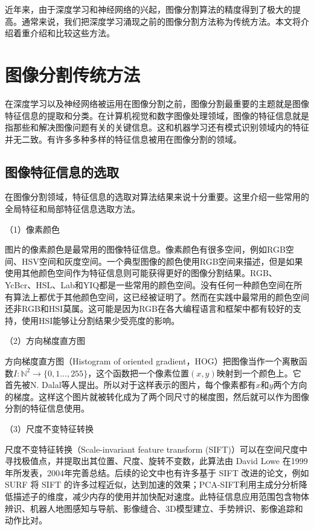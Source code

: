 \documentclass{article}
\begin{document}
近年来，由于深度学习和神经网络的兴起，图像分割算法的精度得到了极大的提高。通常来说，我们把深度学习涌现之前的图像分割方法称为传统方法。本文将介绍着重介绍和比较这些方法。

\section{图像分割传统方法}
在深度学习以及神经网络被运用在图像分割之前，图像分割最重要的主题就是图像特征信息的提取和分类。在计算机视觉和数字图像处理领域，图像的特征信息就是指那些和解决图像问题有关的关键信息。这和机器学习还有模式识别领域内的特征并无二致。有许多多种多样的特征信息被用在图像分割的领域。

\subsection{图像特征信息的选取}
在图像分割领域，特征信息的选取对算法结果来说十分重要。这里介绍一些常用的全局特征和局部特征信息选取方法。

（1）像素颜色

图片的像素颜色是最常用的图像特征信息。像素颜色有很多空间，例如RGB空间、HSV空间和灰度空间。一个典型图像的颜色使用RGB空间来描述，但是如果使用其他颜色空间作为特征信息则可能获得更好的图像分割结果。RGB、 YcBcr、HSL、Lab和YIQ都是一些常用的颜色空间。没有任何一种颜色空间在所有算法上都优于其他颜色空间，这已经被证明了\citep{Color_image_segmentation}。然而在实践中最常用的颜色空间还非RGB和HSI莫属。这可能是因为RGB在各大编程语言和框架中都有较好的支持，使用HSI能够让分割结果少受亮度的影响。

（2）方向梯度直方图

方向梯度直方图（Histogram of oriented gradient，HOG）把图像当作一个离散函数$I: \mathbb{N}^2 \rightarrow \{0,1...,255\}$，这个函数把一个像素位置$(x,y)$映射到一个颜色上。它首先被N. Dalal等人提出\citep{1467360}。所以对于这样表示的图片，每个像素都有$x$和$y$两个方向的梯度。这样这个图片就被转化成为了两个同尺寸的梯度图，然后就可以作为图像分割的特征信息使用。

（3）尺度不变特征转换

尺度不变特征转换（Scale-invariant feature transform (SIFT)）可以在空间尺度中寻找极值点，并提取出其位置、尺度、旋转不变数，此算法由 David Lowe 在1999年所发表，2004年完善总结\citep{Lowe2004}。后续的论文中也有许多基于 SIFT 改进的论文，例如 SURF 将 SIFT 的许多过程近似，达到加速的效果；PCA-SIFT利用主成分分析降低描述子的维度，减少内存的使用并加快配对速度。此特征信息应用范围包含物体辨识、机器人地图感知与导航、影像缝合、3D模型建立、手势辨识、影像追踪和动作比对。
\end{document}
